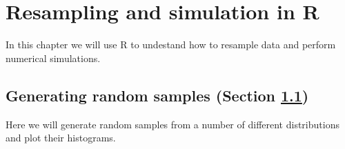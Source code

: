 \documentclass[
  12pt,
]{book}
\begin{document}
\hypertarget{resampling-and-simulation-in-r}{%
\chapter{Resampling and simulation in R}\label{resampling-and-simulation-in-r}}

In this chapter we will use R to undestand how to resample data and perform numerical simulations.

\hypertarget{generating-random-numbers}{%
\section{Generating random samples (Section \ref{generating-random-numbers})}\label{generating-random-numbers}}

Here we will generate random samples from a number of different distributions and plot their histograms.
\end{document}

